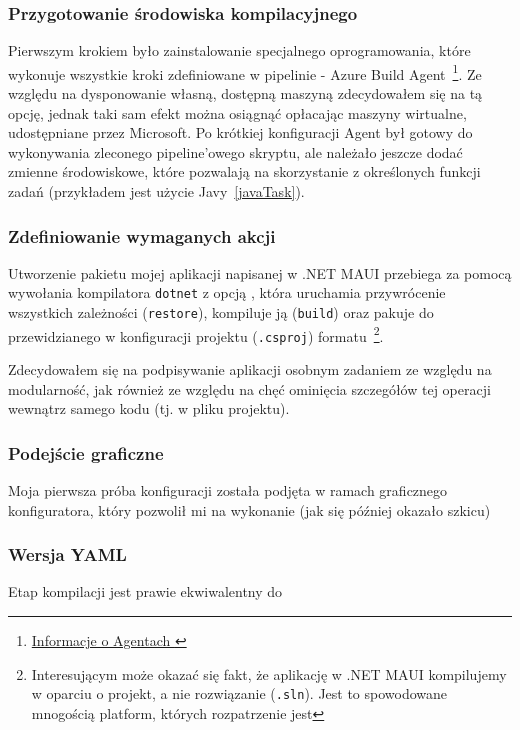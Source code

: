 \subsubsection{Przygotowanie środowiska kompilacyjnego}
Pierwszym krokiem było zainstalowanie specjalnego oprogramowania, 
które wykonuje wszystkie kroki zdefiniowane w pipelinie - Azure Build Agent~\footnote[1]{
    \href{https://learn.microsoft.com/en-us/azure/devops/pipelines/agents/agents}{
        Informacje o Agentach
    }
}.
Ze względu na dysponowanie własną, dostępną maszyną zdecydowałem się na tą opcję,
jednak taki sam efekt można osiągnąć opłacając maszyny wirtualne, udostępniane przez Microsoft.
Po krótkiej konfiguracji Agent był gotowy do 
wykonywania zleconego pipeline'owego skryptu, ale należało jeszcze dodać zmienne środowiskowe, 
które pozwalają na skorzystanie z określonych funkcji zadań (przykładem jest użycie Javy~\ref{javaTask}).

\subsubsection{Zdefiniowanie wymaganych akcji}
Utworzenie pakietu mojej aplikacji napisanej w .NET MAUI przebiega za pomocą wywołania kompilatora 
\verb|dotnet| z opcją , 
która uruchamia przywrócenie wszystkich zależności (\verb|restore|), 
kompiluje ją (\verb|build|) oraz pakuje do przewidzianego w konfiguracji projektu (\verb|.csproj|) formatu~\cprotect\footnote{%
    Interesującym może okazać się fakt, że aplikację w .NET MAUI kompilujemy w oparciu o projekt, a nie rozwiązanie (\verb|.sln|).
    Jest to spowodowane mnogością platform, których rozpatrzenie jest 
}.

Zdecydowałem się na podpisywanie aplikacji osobnym zadaniem ze względu na modularność,
jak również ze względu na chęć ominięcia szczegółów tej operacji wewnątrz samego kodu (tj. w pliku projektu).

\subsubsection{Podejście graficzne}
Moja pierwsza próba konfiguracji została podjęta w ramach graficznego konfiguratora, 
który pozwolił mi na wykonanie (jak się później okazało szkicu) 
\label{javaTask}

\subsubsection{Wersja YAML}
Etap kompilacji jest prawie ekwiwalentny do 